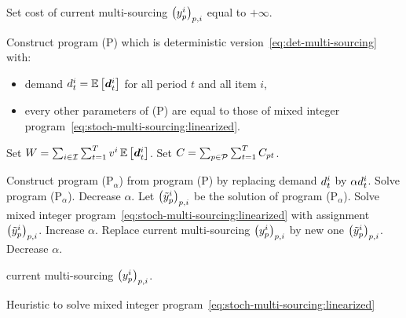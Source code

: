 \begin{algorithm}[H]

\BlankLine

Set cost of current multi-sourcing $\bracket{\open_p^i}_{p,i}$ equal to $+\infty$.

\BlankLine

Construct program (P) which is deterministic version~\eqref{eq:det-multi-sourcing} with:\;
\begin{itemize}
  \item demand $\demand_t^i=\espe\sqbracket{\va\demand_t^i}$ for all period $t$ and all item $i$,
  \item every other parameters of (P) are equal to those of mixed integer program~\eqref{eq:stoch-multi-sourcing:linearized}.\;
\end{itemize}
Set $W=\sum_{i\in\REF}\sum_{t=1}^{\horizon}\rate^i\espe\sqbracket{\va\demand_t^i}$. 
Set $C=\sum_{p\in\mathcal{P}}\sum_{t=1}^{T}C_{pt}$. 

\BlankLine

{
  Construct program (P$_{\alpha}$) from program (P) by replacing demand $d_t^i$ by $\alpha d_t^i$.\;
  Solve program (P$_{\alpha}$). 
  {
    Decrease $\alpha$.\;
  }
  {
    Let $\bracket{\tilde{\open}_p^i}_{p,i}$ be the solution of program (P$_{\alpha}$).\;
    Solve mixed integer program~\eqref{eq:stoch-multi-sourcing:linearized} with assignment $\bracket{\tilde{\open}_p^i}_{p,i}$.\;
    {
      Increase $\alpha$.\;
    }
    {
      {
        Replace current multi-sourcing $\bracket{\open_p^i}_{p,i}$ by new one $\bracket{\tilde{\open}_p^i}_{p,i}$.\;
      }
      Decrease $\alpha$.\;
    }
  }
}

\Return current multi-sourcing $\bracket{\open_p^i}_{p,i}$.\;

\BlankLine
\caption{Heuristic to solve mixed integer program~\eqref{eq:stoch-multi-sourcing:linearized}}
\label{alg:multi-sourcing:MIP:heuristic}
\end{algorithm}


